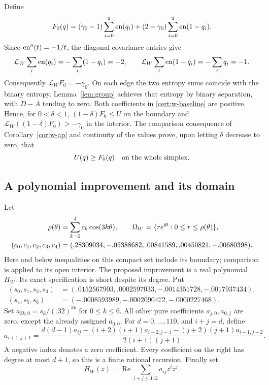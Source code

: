 Define
\begin{equation}
 F_0(q)=(\gamma _0-1)\sum_{i=0}^2\operatorname{en}(q_i)
          +(2-\gamma _0)\sum_{i=0}^2\operatorname{en}(1-q_i).
 \label{cert:w-baseline}
\end{equation}
Since $\operatorname{en}''(t)=-1/t$, the diagonal covariance entries give
\[
 \mathcal L_W\sum_i\operatorname{en}(q_i)=-\sum_i(1-q_i)=-2,
 \qquad
 \mathcal L_W\sum_i\operatorname{en}(1-q_i)=-\sum_iq_i=-1.
\]
Consequently $\mathcal L_WF_0=-\gamma _0$.  On each edge the two
entropy sums coincide with the binary entropy.  Lemma~\ref{lem:group}
achieves that entropy by binary separation, with $D-A$ tending to zero.
Both coefficients in \eqref{cert:w-baseline} are positive.  Hence, for
$0<\delta<1$, $(1-\delta)F_0\le U$ on the boundary and
$\mathcal L_W((1-\delta)F_0)>-\gamma _0$ in the interior.
The comparison consequence of Corollary~\ref{cor:w-ap} and continuity of
the values prove, upon letting $\delta$ decrease to zero, that
\begin{equation}
 U(q)\ge F_0(q)\quad\hbox{on the whole simplex}.
 \label{cert:w-baseline-bound}
\end{equation}

\subsection{A polynomial improvement and its domain}

Let
\begin{align}
 \rho(\theta)&=\sum_{k=0}^4c_k\cos(3k\theta),\qquad
 \Omega_W=\{re^{\mathrm i\theta}:0\le r\le\rho(\theta)\},
 \label{cert:w-shell}\\
 (c_0,c_1,c_2,c_3,c_4)
   &=(.28309034,-.05388682,.00841589,.00450821,-.00680398).
 \notag
\end{align}
Here and below inequalities on this compact set include its boundary;
comparison is applied to its open interior.  The proposed improvement is
a real polynomial $H_W$.  Its exact specification is short despite its
degree.  Put
\begin{align*}
 (s_0,s_1,s_2,s_3)
   &=(.0152567903,.0002597033,-.0014351728,-.0017937434),\\
 (s_4,s_5,s_6)&=(-.0008593989,-.0002090472,-.0000227468).
\end{align*}
Set $a_{3k,0}=s_k/(.32)^{3k}$ for $0\le k\le6$.  All other pure
coefficients $a_{j,0},a_{0,j}$ are zero, except the already assigned
$a_{0,0}$.  For $d=0,\ldots,110$, and $i+j=d$, define
\begin{equation}
 a_{i+1,j+1}=
 \frac{d(d-1)a_{ij}-(i+2)(i+1)a_{i+2,j-1}
                      -(j+2)(j+1)a_{i-1,j+2}}
      {2(i+1)(j+1)}.
 \label{cert:w-recurrence}
\end{equation}
A negative index denotes a zero coefficient.  Every coefficient on the
right has degree at most $d+1$, so this is a finite rational recursion.
Finally set
\begin{equation}
 H_W(z)=\operatorname{Re}\sum_{i+j\le112}a_{ij}z^i\bar z^j.
 \label{cert:w-polynomial}
\end{equation}

